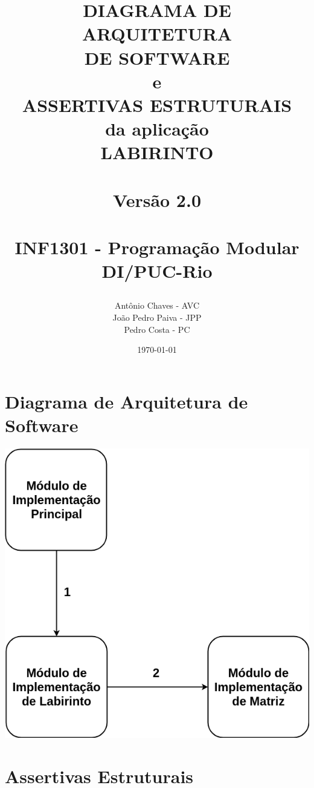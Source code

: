 \documentclass[a4paper,12pt,oneside]{book}
\title{
  \begin{flushright}
  \Huge{DIAGRAMA DE ARQUITETURA\\ DE SOFTWARE\\ e\\ ASSERTIVAS ESTRUTURAIS}\\
  da aplicação\\
  LABIRINTO\\
  ~\\
  \LARGE{Versão 2.0}\\
  ~\\
  INF1301 - Programação Modular\\ DI/PUC-Rio
  \end{flushright}
}
\author{Antônio Chaves - AVC\\João Pedro Paiva - JPP\\Pedro Costa - PC}
\date{\today}
\begin{document}
\frontmatter
\maketitle

\tableofcontents



\mainmatter

\chapter{Diagrama de Arquitetura de Software}

\begin{center}

    \includegraphics[width=1\textwidth]{arquitetura.png}

\end{center}

\chapter{Assertivas Estruturais}    
\end{document}
